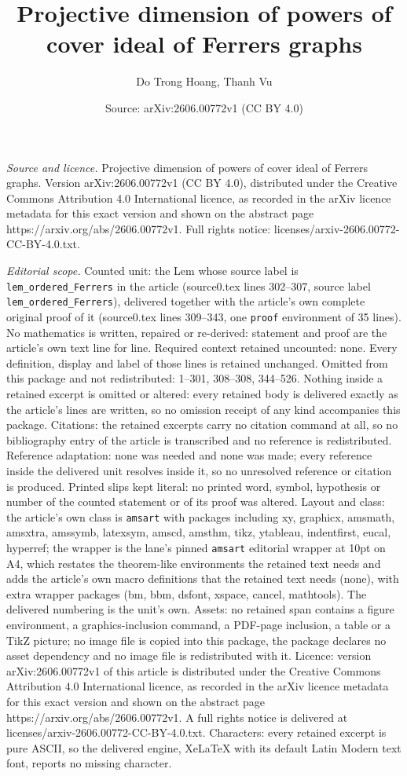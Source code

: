 \documentclass[10pt,a4paper]{amsart}
\title[Projective dimension of powers of cover ideal of Ferrers gra]{Projective dimension of powers of cover ideal of Ferrers graphs}
\author{Do Trong Hoang, Thanh Vu}
\date{Source: arXiv:2606.00772v1 (CC BY 4.0)}
\begin{document}
\maketitle

\noindent\emph{Source and licence.} Projective dimension of powers of cover ideal of Ferrers graphs. Version arXiv:2606.00772v1 (CC BY 4.0), distributed under the Creative Commons Attribution 4.0 International licence, as recorded in the arXiv licence metadata for this exact version and shown on the abstract page https://arxiv.org/abs/2606.00772v1. Full rights notice: licenses/arxiv-2606.00772-CC-BY-4.0.txt.\par\smallskip

\noindent\textit{Editorial scope.} Counted unit: the Lem whose source label is \texttt{lem\_ordered\_Ferrers} in the article (source0.tex lines 302--307, source label \texttt{lem\_ordered\_Ferrers}), delivered together with the article's own complete original proof of it (source0.tex lines 309--343, one \texttt{proof} environment of 35 lines). No mathematics is written, repaired or re-derived: statement and proof are the article's own text line for line. Required context retained uncounted: none. Every definition, display and label of those lines is retained unchanged. Omitted from this package and not redistributed: 1--301, 308--308, 344--526. Nothing inside a retained excerpt is omitted or altered: every retained body is delivered exactly as the article's lines are written, so no omission receipt of any kind accompanies this package. Citations: the retained excerpts carry no citation command at all, so no bibliography entry of the article is transcribed and no reference is redistributed. Reference adaptation: none was needed and none was made; every reference inside the delivered unit resolves inside it, so no unresolved reference or citation is produced. Printed slips kept literal: no printed word, symbol, hypothesis or number of the counted statement or of its proof was altered. Layout and class: the article's own class is \texttt{amsart} with packages including xy, graphicx, amsmath, amsxtra, amssymb, latexsym, amscd, amsthm, tikz, ytableau, indentfirst, eucal, hyperref; the wrapper is the lane's pinned \texttt{amsart} editorial wrapper at 10pt on A4, which restates the theorem-like environments the retained text needs and adds the article's own macro definitions that the retained text needs (none), with extra wrapper packages (bm, bbm, dsfont, xspace, cancel, mathtools). The delivered numbering is the unit's own. Assets: no retained span contains a figure environment, a graphics-inclusion command, a PDF-page inclusion, a table or a TikZ picture; no image file is copied into this package, the package declares no asset dependency and no image file is redistributed with it. Licence: version arXiv:2606.00772v1 of this article is distributed under the Creative Commons Attribution 4.0 International licence, as recorded in the arXiv licence metadata for this exact version and shown on the abstract page https://arxiv.org/abs/2606.00772v1. A full rights notice is delivered at licenses/arxiv-2606.00772-CC-BY-4.0.txt. Characters: every retained excerpt is pure ASCII, so the delivered engine, XeLaTeX with its default Latin Modern text font, reports no missing character.
\end{document}
